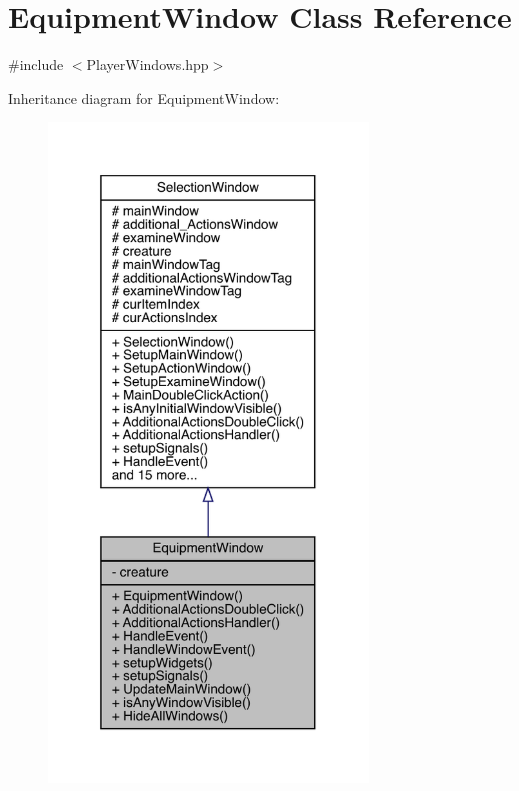 \hypertarget{class_equipment_window}{}\section{Equipment\+Window Class Reference}
\label{class_equipment_window}


{\ttfamily \#include $<$Player\+Windows.\+hpp$>$}



Inheritance diagram for Equipment\+Window\+:
\nopagebreak
\begin{figure}[H]
\begin{center}
\leavevmode
\includegraphics[width=241pt]{d1/d3f/class_equipment_window__inherit__graph}
\end{center}
\end{figure}


